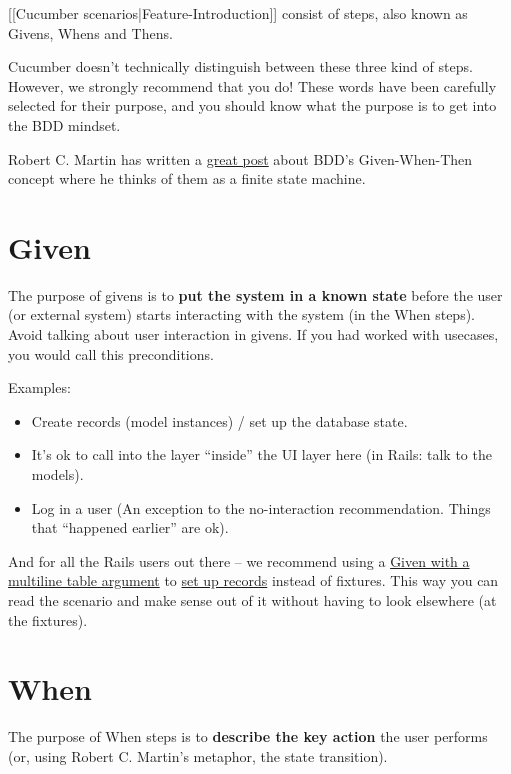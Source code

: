 [[Cucumber scenarios|Feature-Introduction]] consist of steps, also known as Givens, Whens and Thens.

Cucumber doesn't technically distinguish between these three kind of steps. However, we strongly recommend that you do! These words have been carefully selected for their purpose, and you should know what the purpose is to get into the BDD mindset.

Robert C. Martin has written a \href{https://sites.google.com/site/unclebobconsultingllc/the-truth-about-bdd}{great post} about BDD's Given-When-Then concept where he thinks of them as a finite state machine.

\section{Given}

The purpose of givens is to \textbf{put the system in a known state} before the user (or external system) starts interacting with the system (in the When steps). Avoid talking about user interaction in givens.  If you had worked with usecases, you would call this preconditions.

Examples:

\begin{itemize}
  \item Create records (model instances) / set up the database state.
  \item It's ok to call into the layer ``inside'' the UI layer here (in Rails: talk to the models).
  \item Log in a user (An exception to the no-interaction recommendation. Things that ``happened earlier'' are ok).
\end{itemize}

And for all the Rails users out there -- we recommend using a \href{https://github.com/aslakhellesoy/cucumber-rails-test/blob/master/features/manage_lorries.feature}{Given with a multiline table argument} to \href{https://github.com/aslakhellesoy/cucumber-rails-test/blob/master/features/step_definitions/lorry_steps.rb}{set up records} instead of fixtures. This way you can read the scenario and make sense out of it without having to look elsewhere (at the fixtures).

\section{When}

The purpose of When steps is to \textbf{describe the key action} the user performs (or, using Robert C. Martin's metaphor, the state transition).

